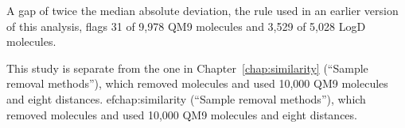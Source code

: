 
A gap of twice the median absolute deviation, the rule used in an earlier version of this analysis, flags 31 of 9,978 QM9 molecules and 3,529 of 5,028 LogD molecules.

This study is separate from the one in Chapter~\ref{chap:similarity} (``Sample removal methods''), which removed molecules and used 10,000 QM9 molecules and eight distances.
ef{chap:similarity} (``Sample removal methods''), which removed molecules and used 10,000 QM9 molecules and eight distances.

